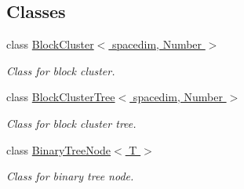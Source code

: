 \subsection*{Classes}
\begin{DoxyCompactItemize}
\item 
class \hyperlink{classBlockCluster}{Block\+Cluster$<$ spacedim, Number $>$}
\begin{DoxyCompactList}\small\item\em Class for block cluster. \end{DoxyCompactList}\item 
class \hyperlink{classBlockClusterTree}{Block\+Cluster\+Tree$<$ spacedim, Number $>$}
\begin{DoxyCompactList}\small\item\em Class for block cluster tree. \end{DoxyCompactList}\item 
class \hyperlink{classBinaryTreeNode}{Binary\+Tree\+Node$<$ T $>$}
\begin{DoxyCompactList}\small\item\em Class for binary tree node. \end{DoxyCompactList}\end{DoxyCompactItemize}
